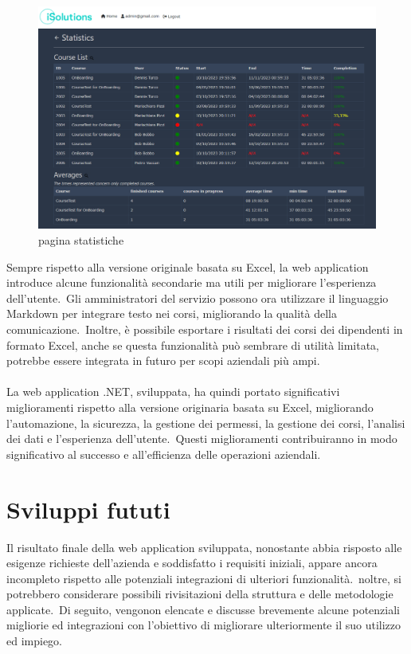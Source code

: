 \begin{figure}[H]
	\centering
	\includegraphics[width=\textwidth]{img/stats2.png}
	\caption{pagina statistiche}
	\label{fig:stats}
\end{figure}

Sempre rispetto alla versione originale basata su Excel, la web application introduce alcune funzionalità secondarie 
ma utili per migliorare l'esperienza dell'utente.\ Gli amministratori del servizio possono ora utilizzare il linguaggio 
Markdown per integrare testo nei corsi, migliorando la qualità della comunicazione.\ Inoltre, è possibile esportare i risultati dei corsi 
dei dipendenti in formato Excel, anche se questa funzionalità può sembrare di utilità limitata, potrebbe essere integrata 
in futuro per scopi aziendali più ampi.
\\ \\
La web application .NET, sviluppata, ha quindi portato significativi miglioramenti rispetto alla versione originaria basata su Excel, 
migliorando l'automazione, la sicurezza, la gestione dei permessi, la gestione dei corsi, l'analisi dei dati e 
l'esperienza dell'utente.\ Questi miglioramenti contribuiranno in modo significativo al successo e all'efficienza 
delle operazioni aziendali.
%
\section{Sviluppi fututi}\label{sec:cap_sec_subsec}
Il risultato finale della web application sviluppata, nonostante abbia risposto alle esigenze richieste dell'azienda e 
soddisfatto i requisiti iniziali, appare ancora incompleto rispetto alle potenziali integrazioni di ulteriori funzionalità.\ 
noltre, si potrebbero considerare possibili rivisitazioni della struttura e delle metodologie applicate.\ Di seguito, 
vengonon elencate e discusse brevemente alcune potenziali migliorie ed integrazioni con l'obiettivo di migliorare 
ulteriormente il suo utilizzo ed impiego.
